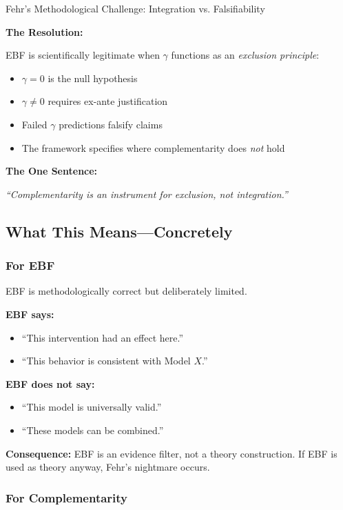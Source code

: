 \begin{chapter}{Fehr's Methodological Challenge: Integration vs. Falsifiability}
\begin{tcolorbox}[colback=blue!5!white,colframe=blue!75!black,title=\textbf{Concluding Statement}]
\textbf{The Resolution:}

EBF is scientifically legitimate when $\gamma$ functions as an \textit{exclusion principle}:
\begin{itemize}[noitemsep]
    \item $\gamma = 0$ is the null hypothesis
    \item $\gamma \neq 0$ requires ex-ante justification
    \item Failed $\gamma$ predictions falsify claims
    \item The framework specifies where complementarity does \textit{not} hold
\end{itemize}

\textbf{The One Sentence:}

\textit{``Complementarity is an instrument for exclusion, not integration.''}

\end{tcolorbox}

\subsection{What This Means---Concretely}

\subsubsection{For EBF}

EBF is methodologically correct but deliberately limited.

\textbf{EBF says:}
\begin{itemize}[noitemsep]
    \item ``This intervention had an effect here.''
    \item ``This behavior is consistent with Model $X$.''
\end{itemize}

\textbf{EBF does not say:}
\begin{itemize}[noitemsep]
    \item ``This model is universally valid.''
    \item ``These models can be combined.''
\end{itemize}

\textbf{Consequence:} EBF is an evidence filter, not a theory construction.
If EBF is used as theory anyway, Fehr's nightmare occurs.

\subsubsection{For Complementarity}


\end{chapter}
